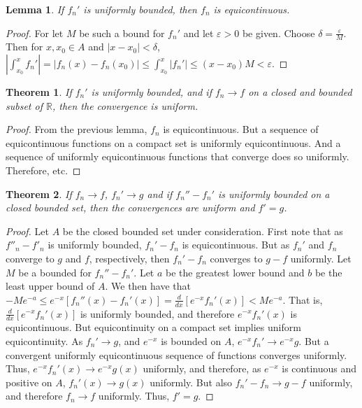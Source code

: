 \documentclass[12pt,oneside]{book}
\theoremstyle{mystyle}
\newtheorem{theorem}{Theorem}[section]
\newtheorem{lemma}{Lemma}[section]
\begin{document}
\begin{lemma}
If $f_n'$ is uniformly bounded, then $f_n$ is equicontinuous.
\end{lemma}
\begin{proof}
For let $M$ be such a bound for $f_n'$ and let $\varepsilon>0$ be given. Choose $\delta = \frac{\varepsilon}{M}$. Then for $x,x_0\in A$ and $|x-x_0|<\delta$, $|\int_{x_0}^{x}f_n'| =|f_n(x)-f_n(x_0)| \leq \int_{x_0}^{x}|f_n'| \leq (x-x_0)M < \varepsilon$.
\end{proof}

\begin{theorem}
If $f_n'$ is uniformly bounded, and if $f_n \rightarrow f$ on a closed and bounded subset of $\mathbb{R}$, then the convergence is uniform.
\end{theorem}
\begin{proof}
From the previous lemma, $f_n$ is equicontinuous. But a sequence of equicontinuous functions on a compact set is uniformly equicontinuous. And a sequence of uniformly equicontinuous functions that converge does so uniformly. Therefore, etc.
\end{proof}

\begin{theorem}
If $f_n \rightarrow f$, $f_n'\rightarrow g$ and if $f_n''-f_n'$ is uniformly bounded on a closed bounded set, then the convergences are uniform and $f' = g$.
\end{theorem}
\begin{proof}
Let $A$ be the closed bounded set under consideration. First note that as $f''_n - f'_n$ is uniformly bounded, $f_n'-f_n$ is equicontinuous. But as $f_n'$ and $f_n$ converge to $g$ and $f$, respectively, then $f_n'-f_n$ converges to $g-f$ uniformly. Let $M$ be a bounded for $f_n''-f_n'$. Let $a$ be the greatest lower bound and $b$ be the least upper bound of $A$. We then have that $-Me^{-a}\leq e^{-x}[f_n''(x)-f_n'(x)]=\frac{d}{dx}[e^{-x}f_n'(x)] < Me^{-a}$. That is, $\frac{d}{dx}[e^{-x}f_n'(x)]$ is uniformly bounded, and therefore $e^{-x}f_n'(x)$ is equicontinuous. But equicontinuity on a compact set implies uniform equicontinuity. As $f_n'\rightarrow g$, and $e^{-x}$ is bounded on $A$, $e^{-x}f_n'\rightarrow e^{-x}g$. But a convergent uniformly equicontinuous sequence of functions converges uniformly. Thus, $e^{-x}f_n'(x) \rightarrow e^{-x}g(x)$ uniformly, and therefore, as $e^{-x}$ is continuous and positive on $A$, $f_n'(x)\rightarrow g(x)$ uniformly. But also $f_n'-f_n \rightarrow g-f$ uniformly, and therefore $f_n \rightarrow f$ uniformly. Thus, $f'=g$.
\end{proof}
\end{document}
